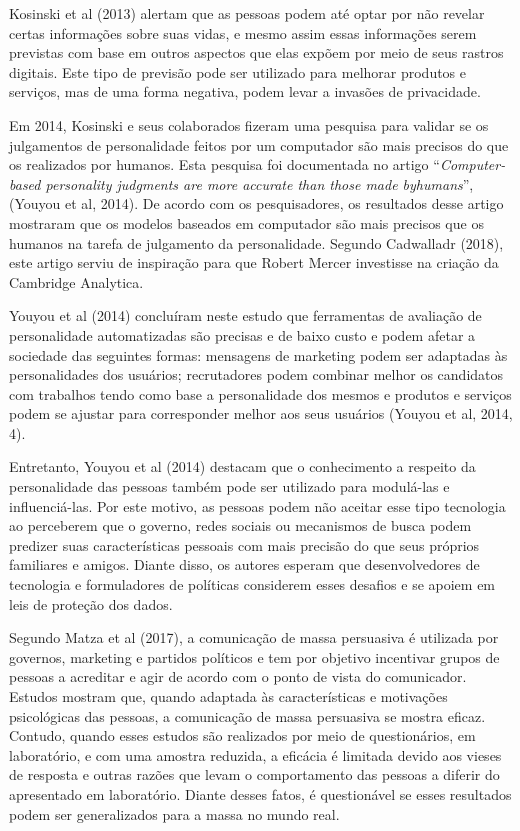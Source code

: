 Kosinski et al (2013) alertam que as pessoas podem até optar por não
revelar certas informações sobre suas vidas, e mesmo assim essas
informações serem previstas com base em outros aspectos que elas expõem
por meio de seus rastros digitais. Este tipo de previsão pode ser
utilizado para melhorar produtos e serviços, mas de uma forma negativa,
podem levar a invasões de privacidade.

Em 2014, Kosinski e seus colaborados fizeram uma pesquisa para validar
se os julgamentos de personalidade feitos por um computador são mais
precisos do que os realizados por humanos. Esta pesquisa foi documentada
no artigo ``\emph{Computer-based personality judgments are more accurate
than those made byhumans}'', (Youyou et al, 2014). De acordo com os
pesquisadores, os resultados desse artigo mostraram que os modelos
baseados em computador são mais precisos que os humanos na tarefa de
julgamento da personalidade. Segundo Cadwalladr (2018), este artigo
serviu de inspiração para que Robert Mercer investisse na criação da
Cambridge Analytica.

Youyou et al (2014) concluíram neste estudo que ferramentas de avaliação
de personalidade automatizadas são precisas e de baixo custo e podem
afetar a sociedade das seguintes formas: mensagens de marketing podem
ser adaptadas às personalidades dos usuários; recrutadores podem
combinar melhor os candidatos com trabalhos tendo como base a
personalidade dos mesmos e produtos e serviços podem se ajustar para
corresponder melhor aos seus usuários (Youyou et al, 2014, 4).

Entretanto, Youyou et al (2014) destacam que o conhecimento a respeito
da personalidade das pessoas também pode ser utilizado para modulá-las e
influenciá-las. Por este motivo, as pessoas podem não aceitar esse tipo
tecnologia ao perceberem que o governo, redes sociais ou mecanismos de
busca podem predizer suas características pessoais com mais precisão do
que seus próprios familiares e amigos. Diante disso, os autores esperam
que desenvolvedores de tecnologia e formuladores de políticas considerem
esses desafios e se apoiem em leis de proteção dos dados.

Segundo Matza et al (2017), a comunicação de massa persuasiva é
utilizada por governos, marketing e partidos políticos e tem por
objetivo incentivar grupos de pessoas a acreditar e agir de acordo com o
ponto de vista do comunicador. Estudos mostram que, quando adaptada às
características e motivações psicológicas das pessoas, a comunicação de
massa persuasiva se mostra eficaz. Contudo, quando esses estudos são
realizados por meio de questionários, em laboratório, e com uma amostra
reduzida, a eficácia é limitada devido aos vieses de resposta e outras
razões que levam o comportamento das pessoas a diferir do apresentado em
laboratório. Diante desses fatos, é questionável se esses resultados
podem ser generalizados para a massa no mundo real.

